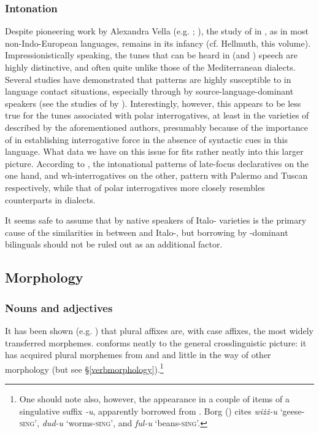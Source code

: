 \documentclass[output=paper]{langsci/langscibook}
\begin{document}
\subsubsection{Intonation}
Despite pioneering work by Alexandra Vella (e.g. \citealt{Vella1994,vella2003,Vella2009}; \citealt{GriceVellaBruggeman2019}), the study of  in , as in most non-Indo-European languages, remains in its infancy (cf. Hellmuth, this volume). Impressionistically speaking, the tunes that can be heard in  (and  ) speech are highly distinctive, and often quite unlike those of the Mediterranean  dialects. Several studies have demonstrated that  patterns are highly susceptible to  in language contact situations, especially through  by source-language-dominant speakers (see the studies of   by \citealt{orourke2005,gabrielkireva2014}). Interestingly, however, this appears to be less true for the tunes associated with polar interrogatives, at least in the varieties of  described by the aforementioned authors, presumably because of the importance of  in establishing interrogative force in the absence of syntactic cues in this language. What data we have on this issue for  fits rather neatly into this larger picture. According to \cite{vella2003}, the intonational patterns of  late-focus declaratives on the one hand, and wh-interrogatives on the other, pattern with Palermo  and Tuscan  respectively, while that of  polar interrogatives more closely resembles counterparts in  dialects.

It seems safe to assume that  by native speakers of Italo- varieties is the primary cause of the similarities in  between  and Italo-, but borrowing by -dominant bilinguals should not be ruled out as an additional factor.

\subsection{Morphology}
\subsubsection{Nouns and adjectives}
 \label{inflection}
It has been shown (e.g. \citealt{Gardani2012,Seifart2017}) that plural affixes are, with case affixes, the most widely transferred  morphemes.  conforms neatly to the general crosslinguistic picture: it has acquired plural morphemes from  and  and little in the way of other  morphology (but see §\ref{verbmorphology}).\footnote{One should note also, however, the appearance in a couple of items of a singulative suffix \textit{-u}, apparently borrowed from . Borg (\citeyear[57]{Borg1994}) cites \textit{wiżż-u} `geese-\textsc{sing}', \textit{dud-u} `worms-\textsc{sing}', and \textit{ful-u} `beans-\textsc{sing}'.}
\end{document}
